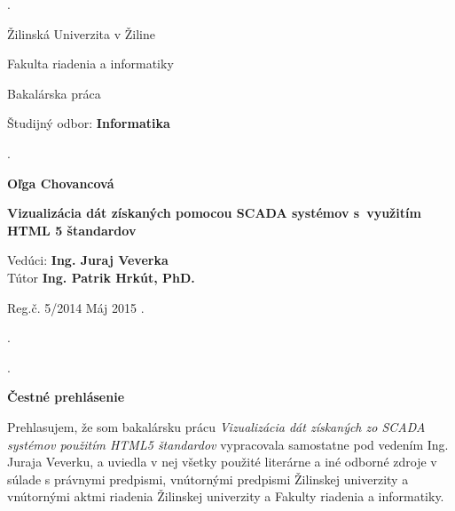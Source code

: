 \begin{titlepage}
\phantom.

\bigskip

\begin{center}
{\sc\LARGE Žilinská Univerzita v Žiline}
\medskip

{\sc\Large Fakulta riadenia a informatiky}

\vfill\vfill\vfill\vfill

{\sc\LARGE Bakalárska práca}

\medskip

{\large Študijný odbor: {\bf Informatika}}
\end{center}


\vfill\vfill\vfill\vfill


\phantom.\hfill

\begin{center}
{\large\bf Oľga Chovancová}

\medskip

{\large\bf Vizualizácia dát získaných pomocou SCADA systémov s~využitím HTML 5 štandardov}

\medskip

Vedúci: {\bf Ing. Juraj Veverka}\\
Tútor	\textbf{Ing. Patrik Hrkút, PhD.}
\medskip
 
\hfill
Reg.č. 5/2014
\hfill
Máj 2015
\hfill\phantom.
\end{center}

\hspace{1.7cm}\phantom.

\vspace{2.9cm}

\phantom.
\end{titlepage}



\newpage

\centerline{\bf Čestné prehlásenie}

\vspace{2em}

\noindent
Prehlasujem, že som bakalársku prácu \textit{Vizualizácia dát získaných zo SCADA systémov použitím HTML5 štandardov} vypracovala samostatne pod vedením Ing. Juraja Veverku, a uviedla v nej všetky použité literárne a iné odborné zdroje v súlade s právnymi predpismi, vnútornými predpismi Žilinskej univerzity a vnútornými aktmi riadenia Žilinskej univerzity a Fakulty riadenia a informatiky.

